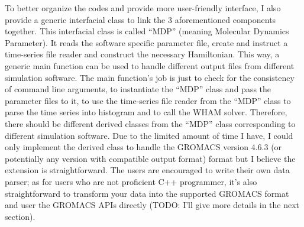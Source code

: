 To better organize the codes and provide more user-friendly interface, I also
provide a generic interfacial class to link the 3 aforementioned components
together. This interfacial class is called ``MDP'' (meaning Molecular Dynamics
Parameter). It reads the software specific parameter file, create and instruct
a time-series file reader and construct the necessary Hamiltonian. This way, a
generic main function can be used to handle different output files from
different simulation software. The main function's job is just to check for the
consistency of command line arguments, to instantiate the ``MDP'' class and
pass the parameter files to it, to use the time-series file reader from the
``MDP'' class to parse the time series into histogram and to call the WHAM
solver. Therefore, there should be different derived classes from the ``MDP''
class corresponding to different simulation software. Due to the limited amount
of time I have, I could only implement the derived class to handle the GROMACS
version 4.6.3 (or potentially any version with compatible output format) format
but I believe the extension is straightforward. The users are encouraged to
write their own data parser; as for users who are not proficient C++
programmer, it's also straightforward to transform your data into the supported
GROMACS format and user the GROMACS APIs directly (TODO: I'll give more details
in the next section).
